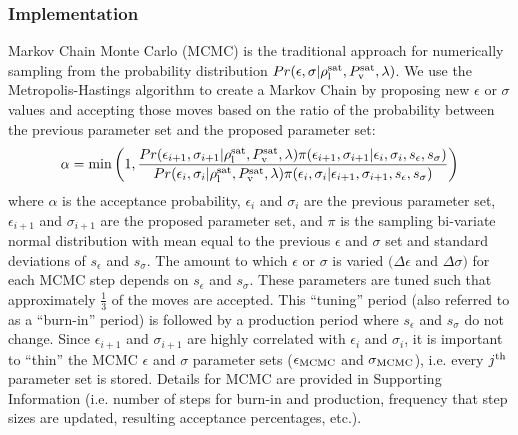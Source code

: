 \documentclass[journal=jctc,manuscript=article]{achemso}
\begin{document}
\subsubsection{Implementation}
Markov Chain Monte Carlo (MCMC) is the traditional approach for numerically sampling from the probability distribution $Pr(\epsilon,\sigma|\rho_{\rm l}^{\rm sat},P_{\rm v}^{\rm sat},\lambda)$. We use the Metropolis-Hastings algorithm to create a Markov Chain by proposing new $\epsilon$ or $\sigma$ values and accepting those moves based on the ratio of the probability between the previous parameter set and the proposed parameter set:
\begin{equation} \label{eq:Acceptance}
\alpha = \min\left(1,\frac{Pr(\epsilon_{i+1},\sigma_{i+1}|\rho_{\rm l}^{\rm sat},P_{\rm v}^{\rm sat},\lambda)\pi(\epsilon_{i+1},\sigma_{i+1}|\epsilon_i,\sigma_i,s_\epsilon,s_\sigma)}{Pr(\epsilon_i,\sigma_i|\rho_{\rm l}^{\rm sat},P_{\rm v}^{\rm sat},\lambda)\pi(\epsilon_i,\sigma_i|\epsilon_{i+1},\sigma_{i+1},s_\epsilon,s_\sigma)}\right)
\end{equation} 
where $\alpha$ is the acceptance probability, $\epsilon_i$ and $\sigma_i$ are the previous parameter set, $\epsilon_{i+1}$ and $\sigma_{i+1}$ are the proposed parameter set, and $\pi$ is the sampling bi-variate normal distribution with mean equal to the previous $\epsilon$ and $\sigma$ set and standard deviations of $s_\epsilon$ and $s_\sigma$. The amount to which $\epsilon$ or $\sigma$ is varied $(\Delta \epsilon$ and $\Delta \sigma)$ for each MCMC step depends on $s_\epsilon$ and $s_\sigma$. These parameters are tuned such that approximately $\frac{1}{3}$ of the moves are accepted. This ``tuning'' period (also referred to as a ``burn-in'' period) is followed by a production period where $s_\epsilon$ and $s_\sigma$ do not change. Since $\epsilon_{i+1}$ and $\sigma_{i+1}$ are highly correlated with $\epsilon_i$ and $\sigma_i$, it is important to ``thin'' the MCMC $\epsilon$ and $\sigma$ parameter sets ($\epsilon_{\rm MCMC}$ and $\sigma_{\rm MCMC}$), i.e. every $j^{\rm th}$ parameter set is stored. Details for MCMC are provided in Supporting Information (i.e. number of steps for burn-in and production, frequency that step sizes are updated, resulting acceptance percentages, etc.).

\end{document}
